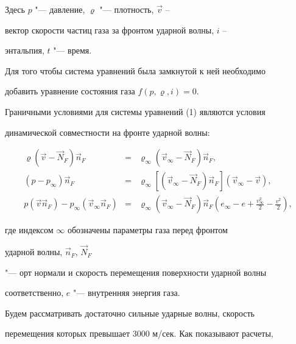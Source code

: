 Здесь $p$ "--- давление, $\varrho$ "--- плотность, $\vec v$ --


вектор скорости частиц газа за фронтом ударной волны, $i$ --


энтальпия, $t$ "--- время.





Для того  чтобы система уравнений была замкнутой к ней необходимо


добавить уравнение состояния газа $f(p, \varrho, i)=0$.





Граничными условиями для системы уравнений (1) являются условия


динамической совместности на фронте ударной волны:


\begin{eqnarray}


\varrho \left(\vec v -\vec N_F\right) \vec


n_F&=&\varrho_\infty\left(\vec


v_\infty-\vec N_F\right) \vec n_F, \nonumber\\


(p-p_\infty) \vec n_F&=&\varrho_\infty\left[\left(\vec


v_\infty-\vec N_F\right) \vec n_F\right] (\vec


v_\infty-\vec v), \nonumber\\


p (\vec v  \vec n_F)-p_\infty(\vec


v_\infty\vec n_F)&=&\varrho_\infty\left(\vec


v_\infty-\vec N_F\right)\vec


n_F \left(e_\infty-e+\frac{v_\infty^2}{2}-\frac{v^2}{2}\right), \nonumber


\end{eqnarray}


где индексом $\infty$ обозначены параметры газа перед фронтом


ударной волны,  $\vec n_F$,  $\vec N_F$


"--- орт нормали и скорость перемещения поверхности ударной волны


соответственно,  $e$ "--- внутренняя энергия газа.





Будем рассматривать достаточно сильные ударные волны,  скорость


перемещения которых превышает 3000 м/сек. Как показывают расчеты,


